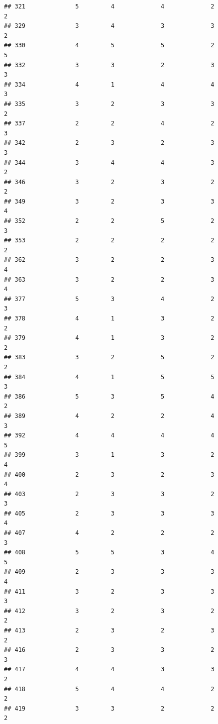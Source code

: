 \documentclass[
]{article}
\begin{document}
\begin{verbatim}
## 321              5         4             4             2           2
## 329              3         4             3             3           2
## 330              4         5             5             2           5
## 332              3         3             2             3           3
## 334              4         1             4             4           3
## 335              3         2             3             3           2
## 337              2         2             4             2           3
## 342              2         3             2             3           3
## 344              3         4             4             3           2
## 346              3         2             3             2           2
## 349              3         2             3             3           4
## 352              2         2             5             2           3
## 353              2         2             2             2           2
## 362              3         2             2             3           4
## 363              3         2             2             3           4
## 377              5         3             4             2           3
## 378              4         1             3             2           2
## 379              4         1             3             2           2
## 383              3         2             5             2           2
## 384              4         1             5             5           3
## 386              5         3             5             4           2
## 389              4         2             2             4           3
## 392              4         4             4             4           5
## 399              3         1             3             2           4
## 400              2         3             2             3           4
## 403              2         3             3             2           3
## 405              2         3             3             3           4
## 407              4         2             2             2           3
## 408              5         5             3             4           5
## 409              2         3             3             3           4
## 411              3         2             3             3           3
## 412              3         2             3             2           2
## 413              2         3             2             3           2
## 416              2         3             3             2           3
## 417              4         4             3             3           2
## 418              5         4             4             2           2
## 419              3         3             2             2           2

\end{verbatim}
\end{document}
